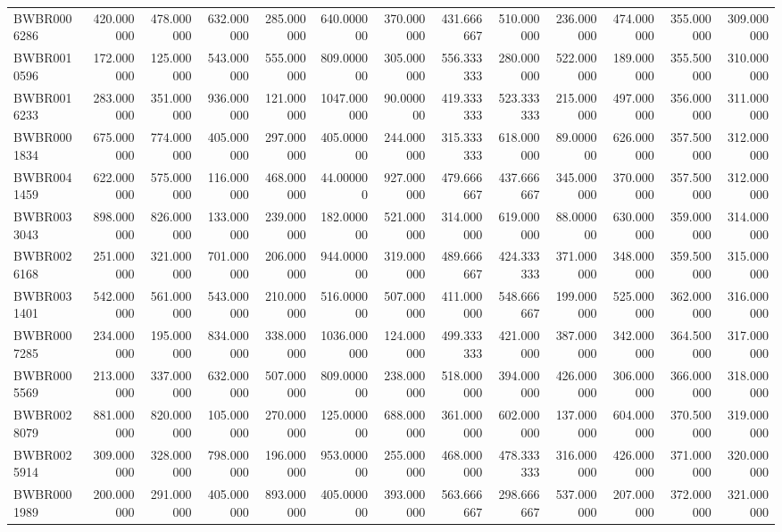 \begin{longtable}{lrrrrrrrrrrrr}
BWBR0006286 & 420.000000 & 478.000000 & 632.000000 & 285.000000 & 640.000000 & 370.000000 & 431.666667 & 510.000000 & 236.000000 & 474.000000 & 355.000000 & 309.000000 \\
BWBR0010596 & 172.000000 & 125.000000 & 543.000000 & 555.000000 & 809.000000 & 305.000000 & 556.333333 & 280.000000 & 522.000000 & 189.000000 & 355.500000 & 310.000000 \\
BWBR0016233 & 283.000000 & 351.000000 & 936.000000 & 121.000000 & 1047.000000 & 90.000000 & 419.333333 & 523.333333 & 215.000000 & 497.000000 & 356.000000 & 311.000000 \\
BWBR0001834 & 675.000000 & 774.000000 & 405.000000 & 297.000000 & 405.000000 & 244.000000 & 315.333333 & 618.000000 & 89.000000 & 626.000000 & 357.500000 & 312.000000 \\
BWBR0041459 & 622.000000 & 575.000000 & 116.000000 & 468.000000 & 44.000000 & 927.000000 & 479.666667 & 437.666667 & 345.000000 & 370.000000 & 357.500000 & 312.000000 \\
BWBR0033043 & 898.000000 & 826.000000 & 133.000000 & 239.000000 & 182.000000 & 521.000000 & 314.000000 & 619.000000 & 88.000000 & 630.000000 & 359.000000 & 314.000000 \\
BWBR0026168 & 251.000000 & 321.000000 & 701.000000 & 206.000000 & 944.000000 & 319.000000 & 489.666667 & 424.333333 & 371.000000 & 348.000000 & 359.500000 & 315.000000 \\
BWBR0031401 & 542.000000 & 561.000000 & 543.000000 & 210.000000 & 516.000000 & 507.000000 & 411.000000 & 548.666667 & 199.000000 & 525.000000 & 362.000000 & 316.000000 \\
BWBR0007285 & 234.000000 & 195.000000 & 834.000000 & 338.000000 & 1036.000000 & 124.000000 & 499.333333 & 421.000000 & 387.000000 & 342.000000 & 364.500000 & 317.000000 \\
BWBR0005569 & 213.000000 & 337.000000 & 632.000000 & 507.000000 & 809.000000 & 238.000000 & 518.000000 & 394.000000 & 426.000000 & 306.000000 & 366.000000 & 318.000000 \\
BWBR0028079 & 881.000000 & 820.000000 & 105.000000 & 270.000000 & 125.000000 & 688.000000 & 361.000000 & 602.000000 & 137.000000 & 604.000000 & 370.500000 & 319.000000 \\
BWBR0025914 & 309.000000 & 328.000000 & 798.000000 & 196.000000 & 953.000000 & 255.000000 & 468.000000 & 478.333333 & 316.000000 & 426.000000 & 371.000000 & 320.000000 \\
BWBR0001989 & 200.000000 & 291.000000 & 405.000000 & 893.000000 & 405.000000 & 393.000000 & 563.666667 & 298.666667 & 537.000000 & 207.000000 & 372.000000 & 321.000000 \\

\end{longtable}
